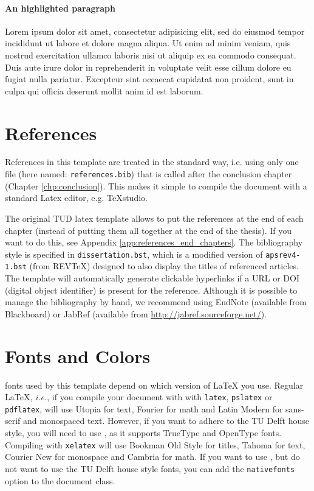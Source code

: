 \paragraph{An highlighted paragraph}
Lorem ipsum dolor sit amet, consectetur adipisicing elit, sed do eiusmod tempor incididunt ut labore et dolore magna aliqua. Ut enim ad minim veniam, quis nostrud exercitation ullamco laboris nisi ut aliquip ex ea commodo consequat. Duis aute irure dolor in reprehenderit in voluptate velit esse cillum dolore eu fugiat nulla pariatur. Excepteur sint occaecat cupidatat non proident, sunt in culpa qui officia deserunt mollit anim id est laborum.

\section{References}

References in this template are treated in the standard way, i.e. using only one file (here named: \texttt{references.bib}) that is called after the conclusion chapter (Chapter \ref{chp:conclusion}). This makes it simple to compile the document with a standard Latex editor, e.g. TeXstudio.

The original TUD latex template allows to put the references at the end of each chapter (instead of putting them all together at the end of the thesis). If you want to do this, see Appendix \ref{app:references_end_chapters}. The bibliography style is specified in \texttt{dissertation.bst}, which is a modified version of \texttt{apsrev4-1.bst} (from REVTeX) designed to also display the titles of referenced articles. The template will automatically generate clickable hyperlinks if a URL or DOI (digital object identifier) is present for the reference. Although it is possible to manage the bibliography by hand, we recommend using EndNote (available from Blackboard) or JabRef (available from \url{http://jabref.sourceforge.net/}).



\section{Fonts and Colors}

 fonts used by this template depend on which version of \LaTeX{} you use. Regular \LaTeX, \emph{i.e.}, if you compile your document with with \texttt{latex}, \texttt{pslatex} or \texttt{pdflatex}, will use Utopia for text, Fourier for math and Latin Modern for sans-serif and monospaced text. However, if you want to adhere to the TU Delft house style, you will need to use \XeLaTeX, as it supports TrueType and OpenType fonts. Compiling with \texttt{xelatex} will use Bookman Old Style for titles, Tahoma for text, Courier New for monospace and Cambria for math. If you want to use \XeLaTeX, but do not want to use the TU Delft house style fonts, you can add the \texttt{nativefonts} option to the document class.

